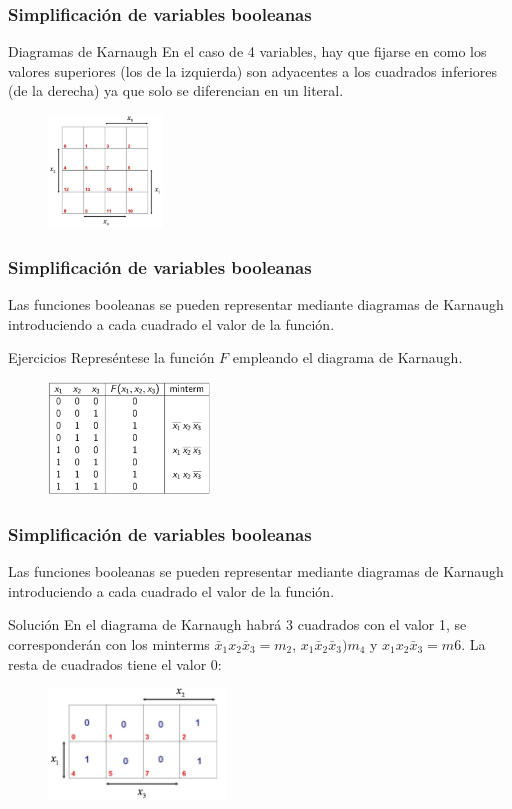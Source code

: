 \documentclass{beamer}
\begin{document}
\begin{frame}
\frametitle{Simplificaci\'on de variables booleanas}
\begin{block}{Diagramas de Karnaugh}
En el caso de 4 variables, hay que fijarse en como los valores superiores (los de la izquierda) son adyacentes a los cuadrados inferiores (de la derecha) ya que solo se diferencian en un literal. 
 \begin{figure}[h]
  \label{fig:volumen}
\centering
\includegraphics[height=3cm]{k3}
\end{figure}
\end{block}
\end{frame}




\begin{frame}
\frametitle{Simplificaci\'on de variables booleanas}
Las funciones booleanas se pueden representar mediante diagramas de Karnaugh introduciendo a cada cuadrado el valor de la funci\'on. 
\begin{block}{Ejercicios}
Repres\'entese la funci\'on $F$ empleando el diagrama de Karnaugh.
 \begin{figure}[h]
  \label{fig:volumen}
\centering
\includegraphics[height=3cm]{k4}
\end{figure}
\end{block}
\end{frame}


\begin{frame}
\frametitle{Simplificaci\'on de variables booleanas}
Las funciones booleanas se pueden representar mediante diagramas de Karnaugh introduciendo a cada cuadrado el valor de la funci\'on. 
\begin{block}{Soluci\'on}
En el diagrama de Karnaugh habr\'a 3 cuadrados con el valor 1, se corresponder\'an con los minterms $\bar x_1 x_2 \bar x_3 = m_2$, $x_1\bar x_2 \bar x_3 ) m_4$ y $x_1x_2\bar x_3 = m6$. La resta de cuadrados tiene el valor 0:
 \begin{figure}[h]
  \label{fig:volumen}
\centering
\includegraphics[height=3cm]{k5}
\end{figure}
\end{block}
\end{frame}
\end{document}
